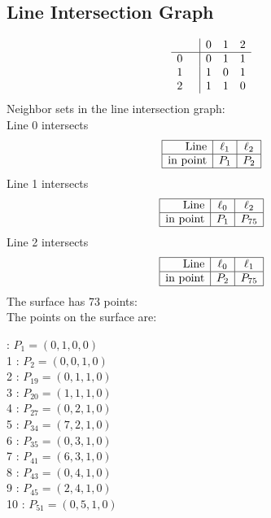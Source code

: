 \documentclass{article}
\begin{document}
{\subsection*{Line Intersection Graph}
{\arraycolsep=1pt
$$
\begin{array}{rr|*{3}r}
 &  & 0 & 1 & 2\\
\hline
0 &  & 0 & 1 & 1\\
1 &  & 1 & 0 & 1\\
2 &  & 1 & 1 & 0\\
\end{array}
$$
}%
Neighbor sets in the line intersection graph:\\
Line 0 intersects 
$$
\begin{array}{|r*{2}{|c}|}
\hline
\mbox{Line}  & \ell_{1} & \ell_{2}\\
\hline
\mbox{in point}  & P_{1} & P_{2}\\
\hline
\end{array}
$$
Line 1 intersects 
$$
\begin{array}{|r*{2}{|c}|}
\hline
\mbox{Line}  & \ell_{0} & \ell_{2}\\
\hline
\mbox{in point}  & P_{1} & P_{75}\\
\hline
\end{array}
$$
Line 2 intersects 
$$
\begin{array}{|r*{2}{|c}|}
\hline
\mbox{Line}  & \ell_{0} & \ell_{1}\\
\hline
\mbox{in point}  & P_{2} & P_{75}\\
\hline
\end{array}
$$
The surface has 73 points:\\
The points on the surface are:\\
\begin{multicols}{3}
 : $P_{1}=( 0, 1, 0, 0 )$\\
1 : $P_{2}=( 0, 0, 1, 0 )$\\
2 : $P_{19}=( 0, 1, 1, 0 )$\\
3 : $P_{20}=( 1, 1, 1, 0 )$\\
4 : $P_{27}=( 0, 2, 1, 0 )$\\
5 : $P_{34}=( 7, 2, 1, 0 )$\\
6 : $P_{35}=( 0, 3, 1, 0 )$\\
7 : $P_{41}=( 6, 3, 1, 0 )$\\
8 : $P_{43}=( 0, 4, 1, 0 )$\\
9 : $P_{45}=( 2, 4, 1, 0 )$\\
10 : $P_{51}=( 0, 5, 1, 0 )$\\

\end{multicols}}
\end{document}

